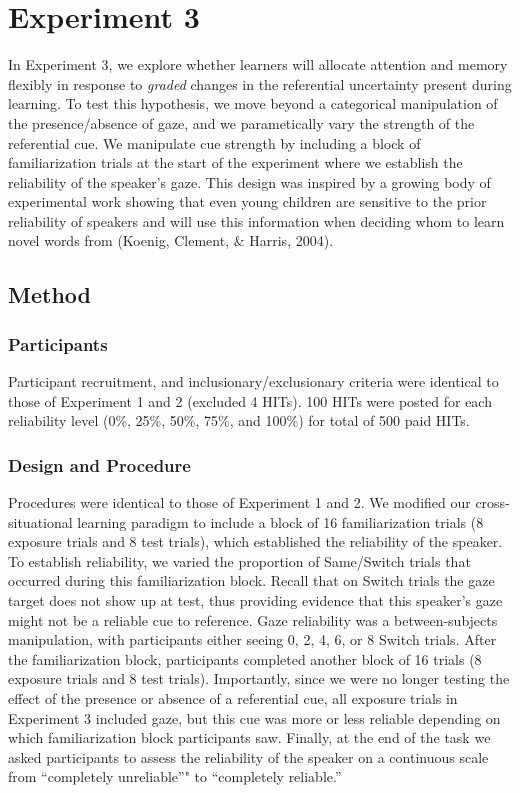 \documentclass[a4paper,man,natbib]{apa6}
\begin{document}
\section{Experiment 3}\label{experiment-3}

In Experiment 3, we explore whether learners will allocate attention and
memory flexibly in response to \emph{graded} changes in the referential
uncertainty present during learning. To test this hypothesis, we move
beyond a categorical manipulation of the presence/absence of gaze, and
we parametically vary the strength of the referential cue. We manipulate
cue strength by including a block of familiarization trials at the start
of the experiment where we establish the reliability of the speaker's
gaze. This design was inspired by a growing body of experimental work
showing that even young children are sensitive to the prior reliability
of speakers and will use this information when deciding whom to learn
novel words from (Koenig, Clement, \& Harris, 2004).

\subsection{Method}\label{method-2}

\subsubsection{Participants}\label{participants-2}

Participant recruitment, and inclusionary/exclusionary criteria were
identical to those of Experiment 1 and 2 (excluded 4 HITs). 100 HITs
were posted for each reliability level (0\%, 25\%, 50\%, 75\%, and
100\%) for total of 500 paid HITs.

\subsubsection{Design and Procedure}\label{design-and-procedure-2}

Procedures were identical to those of Experiment 1 and 2. We modified
our cross-situational learning paradigm to include a block of 16
familiarization trials (8 exposure trials and 8 test trials), which
established the reliability of the speaker. To establish reliability, we
varied the proportion of Same/Switch trials that occurred during this
familiarization block. Recall that on Switch trials the gaze target does
not show up at test, thus providing evidence that this speaker's gaze
might not be a reliable cue to reference. Gaze reliability was a
between-subjects manipulation, with participants either seeing 0, 2, 4,
6, or 8 Switch trials. After the familiarization block, participants
completed another block of 16 trials (8 exposure trials and 8 test
trials). Importantly, since we were no longer testing the effect of the
presence or absence of a referential cue, all exposure trials in
Experiment 3 included gaze, but this cue was more or less reliable
depending on which familiarization block participants saw. Finally, at
the end of the task we asked participants to assess the reliability of
the speaker on a continuous scale from ``completely unreliable''" to
``completely reliable.''
\end{document}
